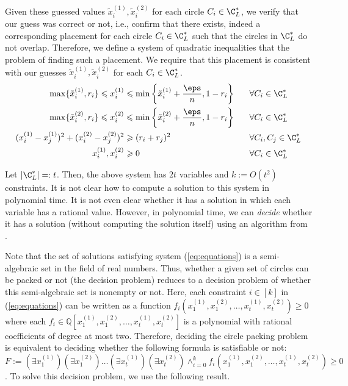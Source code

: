 Given these guessed values $\tilde{x}_{i}^{(1)},\tilde{x}_{i}^{(2)}$
for each circle $C_{i}\in\C_{L}^{*}$, we verify that our guess was
correct or not, i.e., confirm that there exists, indeed a corresponding placement
for each circle $C_{i}\in\C_{L}^{*}$ such that the circles in $\C_{L}^{*}$
do not overlap. Therefore, we define a system of quadratic inequalities
 that  the problem of finding such a placement.
We require that this placement is consistent with
our guesses $\tilde{x}_{i}^{(1)},\tilde{x}_{i}^{(2)}$ for each $C_{i}\in\C_{L}^{*}$.
\begin{alignat}{2}
\max\{\tilde{x}_{i}^{(1)},r_{i}\}\leqslant x_{i}^{(1)} & \leqslant\min\left\{ \tilde{x}_{i}^{(1)}+\frac{\eps}{n},1-r_{i}\right\}  & \,\,\,\,\, & \forall C_{i}\in\C_{L}^{*}\nonumber \\
\max\{\tilde{x}_{i}^{(2)},r_{i}\}\leqslant x_{i}^{(2)} & \leqslant\min\left\{ \tilde{x}_{i}^{(2)}+\frac{\eps}{n},1-r_{i}\right\}  &  & \forall C_{i}\in\C_{L}^{*}\label{eq:equations}\\
(x_{i}^{(1)}-x_{j}^{(1)})^{2}+(x_{i}^{(2)}-x_{j}^{(2)})^{2} & \geqslant(r_{i}+r_{j})^{2} &  & \forall C_{i},C_{j}\in\C_{L}^{*}\nonumber \\
x_{i}^{(1)},x_{i}^{(2)} & \geqslant0 &  & \forall C_{i}\in\C_{L}^{*}\nonumber
\end{alignat}

Let $|\C_{L}^{*}|=: t$. Then, the above system has $2t$ variables and $k:=O(t^2)$ constraints. 
It is not clear how to compute a solution to this system in polynomial
time. It is not even clear whether it has a solution in which each variable
has a rational value. However, in polynomial time, we can \emph{decide}
whether it has a solution (without computing the solution itself) using an algorithm from \cite{GrigorevVV88}.

Note that the set of solutions satisfying system (\ref{eq:equations}) is a semi-algebraic set in the field of real numbers. 
Thus, whether a given set of circles can be packed or not (the decision problem) reduces to a decision problem of whether
this semi-algebraic set is nonempty or not. 
Here, each constraint $i \in [k]$ in (\ref{eq:equations}) can be written as a function $f_i (x_{1}^{(1)},x_{1}^{(2)}, \dots, x_{t}^{(1)},x_{t}^{(2)})\geqslant 0$ where each $f_i \in \mathbb{Q}[x_{1}^{(1)},x_{1}^{(2)}, \dots, x_{t}^{(1)},x_{t}^{(2)}]$ is a polynomial with rational coefficients of degree at most two.
Therefore, deciding the circle packing problem is equivalent to deciding whether the following formula is satisfiable or not: $F:= (\exists x_{1}^{(1)})(\exists x_{1}^{(2)}) \dots (\exists x_{t}^{(1)}) (\exists x_{t}^{(2)}) \land_{i=0}^{k} f_i(x_{1}^{(1)},x_{1}^{(2)}, \dots, x_{t}^{(1)},x_{t}^{(2)}) \geqslant 0$. 
To solve this decision problem, we use the following result.

